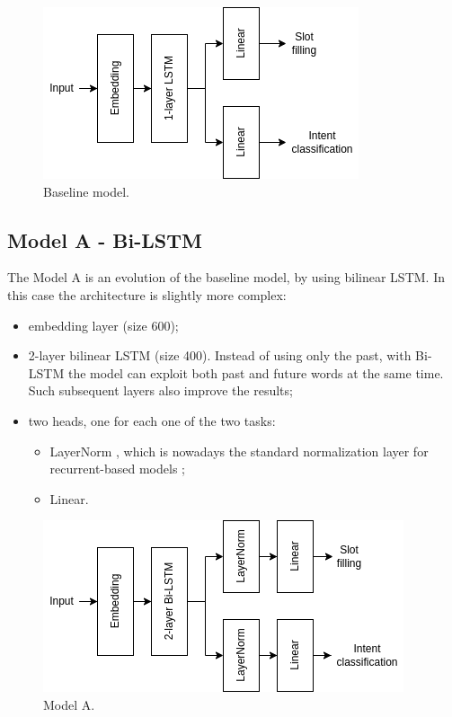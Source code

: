 \documentclass[a4paper]{article}
\begin{document}
\begin{figure}[!h]
    \centering
    \includegraphics[width=0.8\linewidth]{images/baseline.png}
    \caption{Baseline model.}
    \label{fig:baseline-model}
\end{figure}

\subsection{Model A - Bi-LSTM}
The Model A is an evolution of the baseline model, by using bilinear LSTM. In this case the architecture is slightly more complex:
\begin{itemize}
    \item embedding layer (size 600);
    \item 2-layer bilinear LSTM (size 400). Instead of using only the past, with Bi-LSTM the model can exploit both past and future words at the same time. Such subsequent layers also improve the results;
    \item two heads, one for each one of the two tasks:
    \begin{itemize}
        \item LayerNorm \cite{https://doi.org/10.48550/arxiv.1607.06450}, which is nowadays the standard normalization layer for recurrent-based models \cite{DBLP:journals/corr/VaswaniSPUJGKP17};
        \item Linear.
    \end{itemize}
\end{itemize}

\begin{figure}[!h]
    \centering
    \includegraphics[width=0.8\linewidth]{images/model-a.png}
    \caption{Model A.}
    \label{fig:model-a}
\end{figure}
\end{document}
